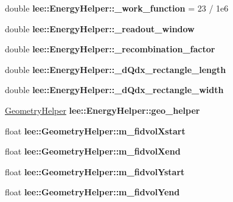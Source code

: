 \begin{DoxyCompactItemize}
\item 
\hypertarget{group__lee_gafed9eac818bc9ab7f0c0cd3c808feeea}{double {\bfseries lee\-::\-Energy\-Helper\-::\-\_\-work\-\_\-function} = 23 / 1e6}\label{group__lee_gafed9eac818bc9ab7f0c0cd3c808feeea}

\item 
\hypertarget{group__lee_gad704feff08cf9f09aa46f306e126bbbb}{double {\bfseries lee\-::\-Energy\-Helper\-::\-\_\-readout\-\_\-window}}\label{group__lee_gad704feff08cf9f09aa46f306e126bbbb}

\item 
\hypertarget{group__lee_gafbe2338334b0bb800473d29350d866d1}{double {\bfseries lee\-::\-Energy\-Helper\-::\-\_\-recombination\-\_\-factor}}\label{group__lee_gafbe2338334b0bb800473d29350d866d1}

\item 
\hypertarget{group__lee_gaffce1a06abee9651a41c454aa5f9032f}{double {\bfseries lee\-::\-Energy\-Helper\-::\-\_\-d\-Qdx\-\_\-rectangle\-\_\-length}}\label{group__lee_gaffce1a06abee9651a41c454aa5f9032f}

\item 
\hypertarget{group__lee_ga227149dafb056c355057c753ac768b13}{double {\bfseries lee\-::\-Energy\-Helper\-::\-\_\-d\-Qdx\-\_\-rectangle\-\_\-width}}\label{group__lee_ga227149dafb056c355057c753ac768b13}

\item 
\hypertarget{group__lee_ga613fe58326a28695ad83ddd7bdf8ff57}{\hyperlink{classGeometryHelper}{Geometry\-Helper} {\bfseries lee\-::\-Energy\-Helper\-::geo\-\_\-helper}}\label{group__lee_ga613fe58326a28695ad83ddd7bdf8ff57}

\item 
\hypertarget{group__lee_gaf555c24c00c66fa78b480b72633678b3}{float {\bfseries lee\-::\-Geometry\-Helper\-::m\-\_\-fidvol\-Xstart}}\label{group__lee_gaf555c24c00c66fa78b480b72633678b3}

\item 
\hypertarget{group__lee_ga65a7d75c7b48384cf068e8336c6b8d55}{float {\bfseries lee\-::\-Geometry\-Helper\-::m\-\_\-fidvol\-Xend}}\label{group__lee_ga65a7d75c7b48384cf068e8336c6b8d55}

\item 
\hypertarget{group__lee_ga7a6451c1fc8cbf3d473820d3a63e2011}{float {\bfseries lee\-::\-Geometry\-Helper\-::m\-\_\-fidvol\-Ystart}}\label{group__lee_ga7a6451c1fc8cbf3d473820d3a63e2011}

\item 
\hypertarget{group__lee_ga264c826fdc8dff5cee93435d0e7391db}{float {\bfseries lee\-::\-Geometry\-Helper\-::m\-\_\-fidvol\-Yend}}\label{group__lee_ga264c826fdc8dff5cee93435d0e7391db}


\end{DoxyCompactItemize}
